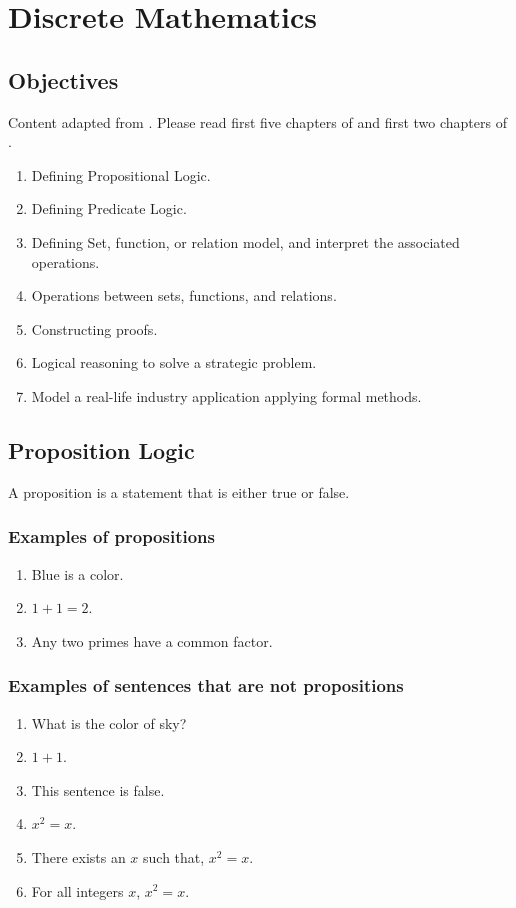 
\setcounter{marks}{0}

\chapter{Discrete Mathematics}
\section{Objectives}
Content adapted from \cite{piff1991discrete, rosen2007discrete, ldkr-ml2017-SetTheory}. Please read first five chapters of \cite{piff1991discrete} and first two chapters of \cite{rosen2007discrete}.
\begin{enumerate}
\item Defining Propositional Logic.
\item Defining Predicate Logic.
\item Defining Set, function, or relation model, and interpret the associated operations.
\item Operations between sets, functions, and relations.
\item Constructing proofs.
\item Logical reasoning to solve a strategic problem.
\item Model a real-life industry application applying formal methods.
\end{enumerate}

\section{Proposition Logic}
\begin{definition}[Proposition]
  A proposition is a statement that is either true or false.
\end{definition}

\subsection{Examples of propositions}
\begin{enumerate}
  \item Blue is a color.
  \item $1 + 1 = 2$.
  \item Any two primes have a common factor.
\end{enumerate}

\subsection{Examples of sentences that are not propositions}
\begin{enumerate}
  \item What is the color of sky?
  \item $1 + 1$.
  \item This sentence is false.
  \item $x^2 = x$.
  \item There exists an $x$ such that, $x^2 = x$.
  \item For all integers $x$, $x^2 = x$.
\end{enumerate}


